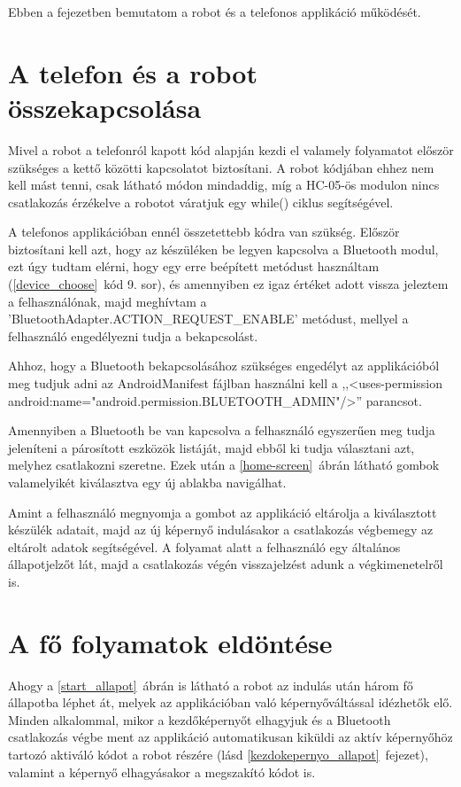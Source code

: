 \documentclass[]{thesis-ekf}
\theoremstyle{definition}
\begin{document}
Ebben a fejezetben bemutatom a robot és a telefonos applikáció működését.
\section{A telefon és a robot összekapcsolása}
Mivel a robot a telefonról kapott kód alapján kezdi el valamely folyamatot először szükséges a kettő közötti kapcsolatot biztosítani. A robot kódjában ehhez nem kell mást tenni, csak  látható módon mindaddig, míg a HC-05-ös modulon nincs csatlakozás érzékelve a robotot váratjuk egy while() ciklus segítségével.


A telefonos applikációban ennél összetettebb kódra van szükség. Először biztosítani kell azt, hogy az készüléken be legyen kapcsolva a Bluetooth modul, ezt úgy tudtam elérni, hogy egy erre beépített metódust használtam\cite{Bluetooth_active} (\ref{device_choose}~kód 9. sor), és amennyiben ez igaz értéket adott vissza jeleztem a felhasználónak, majd meghívtam a 'BluetoothAdapter.ACTION\_REQUEST\_ENABLE' metódust\cite{Bluetooth_enable}, mellyel a felhasználó engedélyezni tudja a bekapcsolást. 


Ahhoz, hogy a Bluetooth bekapcsolásához szükséges engedélyt az applikációból meg tudjuk adni az AndroidManifest fájlban használni kell a ,,<uses-permission android:name="android.permission.BLUETOOTH\_ADMIN"/>'' parancsot.

Amennyiben a Bluetooth be van kapcsolva a felhasználó egyszerűen meg tudja jeleníteni a párosított eszközök listáját, majd ebből ki tudja választani azt, melyhez csatlakozni szeretne. Ezek után a \ref{home-screen}~ábrán látható gombok valamelyikét kiválasztva egy új ablakba navigálhat.

Amint a felhasználó megnyomja a gombot az applikáció eltárolja a kiválasztott készülék adatait, majd az új képernyő indulásakor a csatlakozás végbemegy az eltárolt adatok segítségével\cite{Bluetooth_connect}. A folyamat alatt a felhasználó egy általános állapotjelzőt lát, majd a csatlakozás végén visszajelzést adunk a végkimenetelről is.
\section{A fő folyamatok eldöntése}
Ahogy a \ref{start_allapot}~ábrán is látható a robot az indulás után három fő állapotba léphet át, melyek az applikációban való képernyőváltással idézhetők elő. Minden alkalommal, mikor a kezdőképernyőt elhagyjuk és a Bluetooth csatlakozás végbe ment az applikáció automatikusan kiküldi az aktív képernyőhöz tartozó aktiváló kódot a robot részére (lásd \ref{kezdokepernyo_allapot}~fejezet), valamint a képernyő elhagyásakor a megszakító kódot is.
\end{document}
